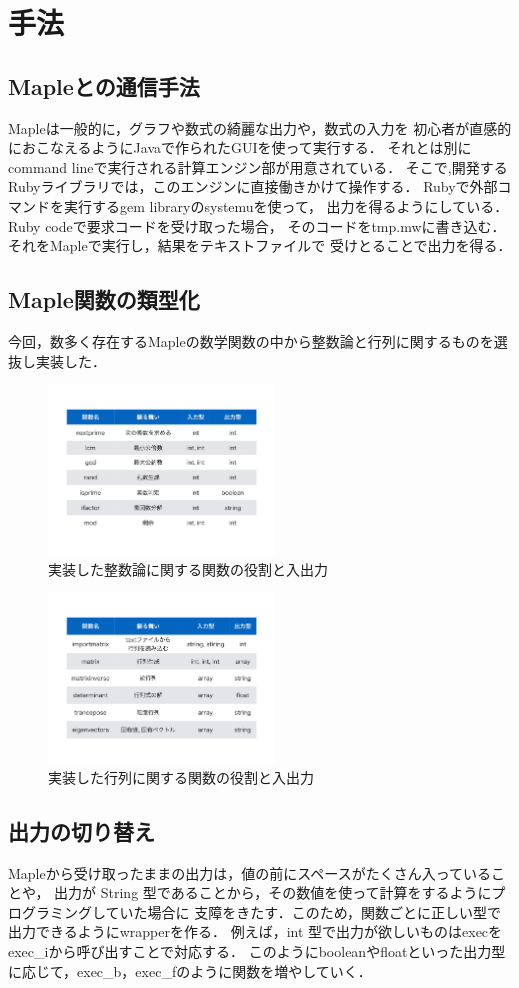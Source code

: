 \section{手法}
\subsection{Mapleとの通信手法}
Mapleは一般的に，グラフや数式の綺麗な出力や，数式の入力を
初心者が直感的におこなえるようにJavaで作られたGUIを使って実行する．
それとは別にcommand lineで実行される計算エンジン部が用意されている．
そこで,開発するRubyライブラリでは，このエンジンに直接働きかけて操作する．
Rubyで外部コマンドを実行するgem libraryのsystemuを使って，
出力を得るようにしている．Ruby codeで要求コードを受け取った場合，
そのコードをtmp.mwに書き込む．それをMapleで実行し，結果をテキストファイルで
受けとることで出力を得る．

\subsection{Maple関数の類型化}
今回，数多く存在するMapleの数学関数の中から整数論と行列に関するものを選抜し実装した．

\begin{figure}[htbp]\begin{center}
\includegraphics[width=6cm,bb=0 0 442 500]{../figs/./mapleruby_eringi.001.png}
\caption{実装した整数論に関する関数の役割と入出力}
\label{default}\end{center}\end{figure}
\begin{figure}[htbp]\begin{center}
\includegraphics[width=6cm,bb=0 0 442 500]{../figs/./mapleruby_eringi.002.png}
\caption{実装した行列に関する関数の役割と入出力}
\label{default}\end{center}\end{figure}
\subsection{出力の切り替え}
Mapleから受け取ったままの出力は，値の前にスペースがたくさん入っていることや，
出力が String 型であることから，その数値を使って計算をするようにプログラミングしていた場合に
支障をきたす．このため，関数ごとに正しい型で出力できるようにwrapperを作る．
例えば，int 型で出力が欲しいものはexecをexec\_iから呼び出すことで対応する．
このようにbooleanやfloatといった出力型に応じて，exec\_b，exec\_fのように関数を増やしていく．

